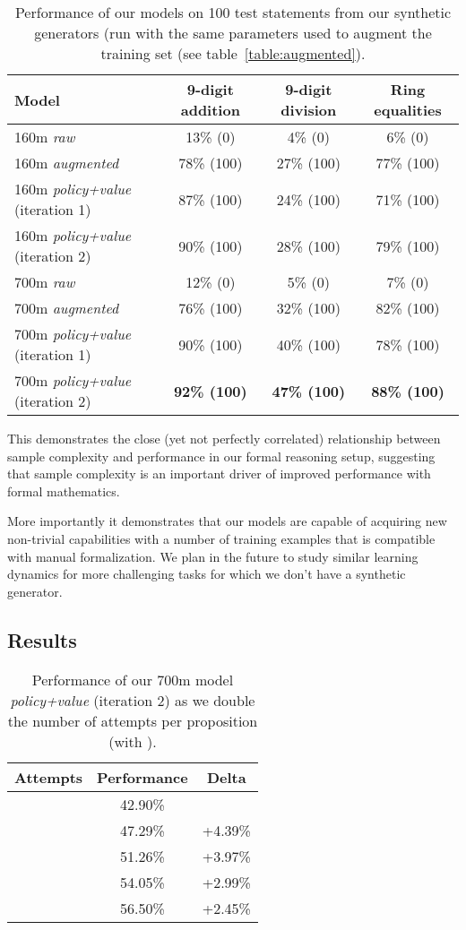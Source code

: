 \documentclass{article}
\begin{document}
\begin{table}[ht]
\caption{Performance of our models on 100 test statements from our synthetic generators (run with the same parameters used to augment the training set (see table~\ref{table:augmented}).} 
\centering
\begin{tabular}{ |l|c|c|c| }
    \hline
    Model & 9-digit addition & 9-digit division & Ring equalities \\
    \hline
    160m \textit{raw} & 13\% (0) & 4\% (0) & 6\% (0) \\
    160m \textit{augmented} & 78\% (100) & 27\% (100) & 77\% (100) \\
    160m \textit{policy+value} (iteration 1) & 87\% (100) & 24\% (100) & 71\% (100) \\
    160m \textit{policy+value} (iteration 2) & 90\% (100) & 28\% (100) & 79\% (100) \\
    700m \textit{raw} & 12\% (0) & 5\% (0) & 7\% (0) \\
    700m \textit{augmented} & 76\% (100) & 32\% (100) & 82\% (100) \\
    700m \textit{policy+value} (iteration 1) & 90\% (100) & 40\% (100) & 78\% (100) \\
    700m \textit{policy+value} (iteration 2) & \textbf{92\% (100)} & \textbf{47\% (100)} & \textbf{88\% (100)} \\
    \hline
\end{tabular}
\label{table:samplecomplexity}
\end{table}

This demonstrates the close (yet not perfectly correlated) relationship between sample complexity and performance in our formal reasoning setup, suggesting that sample complexity is an important driver of improved performance with formal mathematics.

More importantly it demonstrates that our models are capable of acquiring new non-trivial capabilities with a number of training examples that is compatible with manual formalization. We plan in the future to study similar learning dynamics for more challenging tasks for which we don't have a synthetic generator.

\subsection{Results}

\begin{table}[ht]
\caption{Performance of our 700m model \textit{policy+value} (iteration 2) as we double the number of attempts  per proposition (with ).} 
\centering
\begin{tabular}{ |l|c|c| }
    \hline
    Attempts & Performance & Delta \\
    \hline
     & 42.90\% & \\
     & 47.29\% & +4.39\% \\
     & 51.26\% & +3.97\% \\
     & 54.05\% & +2.99\% \\
     & 56.50\% & +2.45\% \\
    \hline
\end{tabular}
\label{table:attempts}
\end{table}
\end{document}
